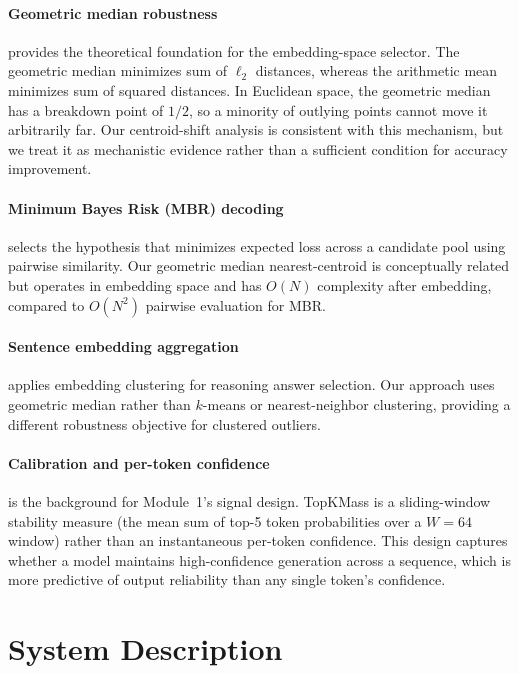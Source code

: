 \documentclass[11pt]{article}
\begin{document}
\paragraph{Geometric median robustness \citep{weiszfeld1937point,minsker2015geometric}}
provides the theoretical foundation for the embedding-space selector. The
geometric median minimizes sum of $\ell_2$ distances, whereas the arithmetic mean
minimizes sum of squared distances. In Euclidean space, the geometric median has
a breakdown point of $1/2$, so a minority of outlying points cannot move it
arbitrarily far. Our centroid-shift analysis is consistent with this mechanism,
but we treat it as mechanistic evidence rather than a sufficient condition for
accuracy improvement.

\paragraph{Minimum Bayes Risk (MBR) decoding \citep{eikema2020map}}
selects the hypothesis that minimizes expected loss across a candidate pool using
pairwise similarity. Our geometric median nearest-centroid is conceptually
related but operates in embedding space and has $O(N)$ complexity after
embedding, compared to $O(N^2)$ pairwise evaluation for MBR.

\paragraph{Sentence embedding aggregation \citep{li2023making}}
applies embedding clustering for reasoning answer selection. Our approach uses
geometric median rather than $k$-means or nearest-neighbor clustering, providing
a different robustness objective for clustered outliers.

\paragraph{Calibration and per-token confidence \citep{guo2017calibration}}
is the background for Module~1's signal design. TopKMass is a sliding-window
stability measure (the mean sum of top-5 token probabilities over a $W=64$
window) rather than an instantaneous per-token confidence. This design captures
whether a model maintains high-confidence generation across a sequence, which is
more predictive of output reliability than any single token's confidence.

\section{System Description}
\label{sec:system}
\end{document}
